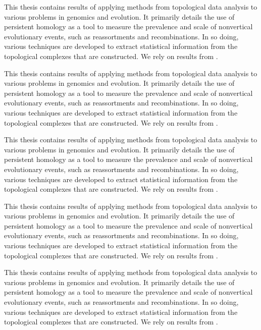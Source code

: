 This thesis contains results of applying methods from topological data analysis to various problems in genomics and evolution.
It primarily details the use of persistent homology as a tool to measure the prevalence and scale of nonvertical evolutionary events, such as reassortments and recombinations.
In so doing, various techniques are developed to extract statistical information from the topological complexes that are constructed.
We rely on results from \cite{Grosz_and_Sidner_1986}.

This thesis contains results of applying methods from topological data analysis to various problems in genomics and evolution.
It primarily details the use of persistent homology as a tool to measure the prevalence and scale of nonvertical evolutionary events, such as reassortments and recombinations.
In so doing, various techniques are developed to extract statistical information from the topological complexes that are constructed.
We rely on results from \cite{Grosz_and_Sidner_1986}.

This thesis contains results of applying methods from topological data analysis to various problems in genomics and evolution.
It primarily details the use of persistent homology as a tool to measure the prevalence and scale of nonvertical evolutionary events, such as reassortments and recombinations.
In so doing, various techniques are developed to extract statistical information from the topological complexes that are constructed.
We rely on results from \cite{Grosz_and_Sidner_1986}.

This thesis contains results of applying methods from topological data analysis to various problems in genomics and evolution.
It primarily details the use of persistent homology as a tool to measure the prevalence and scale of nonvertical evolutionary events, such as reassortments and recombinations.
In so doing, various techniques are developed to extract statistical information from the topological complexes that are constructed.
We rely on results from \cite{Grosz_and_Sidner_1986}.

This thesis contains results of applying methods from topological data analysis to various problems in genomics and evolution.
It primarily details the use of persistent homology as a tool to measure the prevalence and scale of nonvertical evolutionary events, such as reassortments and recombinations.
In so doing, various techniques are developed to extract statistical information from the topological complexes that are constructed.
We rely on results from \cite{Grosz_and_Sidner_1986}.

